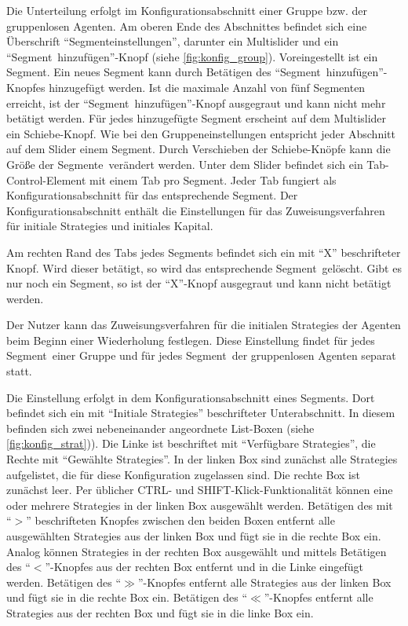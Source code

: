 \documentclass[parskip=full,11pt]{scrartcl}
\def\segment{Segment}
\def\segments{Segmente}
\begin{document}
Die Unterteilung erfolgt im Konfigurationsabschnitt einer Gruppe bzw. der gruppenlosen Agenten. Am oberen Ende des Abschnittes befindet sich eine Überschrift \enquote{\segment einstellungen}, darunter ein \Gls{Multislider} und ein \enquote{\segment\ hinzufügen}-Knopf (siehe \cref{fig:konfig_group}). Voreingestellt ist ein Segment. Ein neues Segment kann durch Betätigen des \enquote{\segment\ hinzufügen}-Knopfes hinzugefügt werden. Ist die maximale Anzahl von fünf \segments n erreicht, ist der \enquote{\segment\ hinzufügen}-Knopf ausgegraut und kann nicht mehr betätigt werden. Für jedes hinzugefügte Segment erscheint auf dem \Gls{Multislider} ein Schiebe-Knopf. Wie bei den Gruppeneinstellungen entspricht jeder Abschnitt auf dem Slider einem \segment. Durch Verschieben der Schiebe-Knöpfe kann die Größe der \segments\ verändert werden. Unter dem Slider befindet sich ein Tab-Control-Element mit einem Tab pro \segment. Jeder Tab fungiert als Konfigurationsabschnitt für das entsprechende \segment. Der Konfigurationsabschnitt enthält die Einstellungen für das Zuweisungsverfahren für initiale \Glspl{Strategie} und initiales \Gls{Kapital}.

Am rechten Rand des Tabs jedes \segment s befindet sich ein mit \enquote{X} beschrifteter Knopf. Wird dieser betätigt, so wird das entsprechende \segment\ gelöscht. Gibt es nur noch ein \segment, so ist der \enquote{X}-Knopf ausgegraut und kann nicht betätigt werden.

Der \Gls{Nutzer} kann das Zuweisungsverfahren für die initialen \Glspl{Strategie} der Agenten beim Beginn einer Wiederholung festlegen. Diese Einstellung findet für jedes \segment\ einer Gruppe und für jedes \segment\ der gruppenlosen Agenten separat statt.

Die Einstellung erfolgt in dem Konfigurationsabschnitt eines \segment s. Dort befindet sich ein mit \enquote{Initiale \Glspl{Strategie}} beschrifteter Unterabschnitt. In diesem befinden sich zwei nebeneinander angeordnete List-Boxen (siehe \cref{fig:konfig_strat})). Die Linke ist beschriftet mit \enquote{Verfügbare \Glspl{Strategie}}, die Rechte mit \enquote{Gewählte \Glspl{Strategie}}. In der linken Box sind zunächst alle \Glspl{Strategie} aufgelistet, die für diese \Gls{Konfiguration} zugelassen sind. Die rechte Box ist zunächst leer. Per üblicher \textsf{CTRL}- und \textsf{SHIFT}-Klick-Funktionalität können eine oder mehrere \Glspl{Strategie} in der linken Box ausgewählt werden. Betätigen des mit \enquote{\(>\)} beschrifteten Knopfes zwischen den beiden Boxen entfernt alle ausgewählten \Glspl{Strategie} aus der linken Box und fügt sie in die rechte Box ein. Analog können \Glspl{Strategie} in der rechten Box ausgewählt und mittels Betätigen des \enquote{\(<\)}-Knopfes aus der rechten Box entfernt und in die Linke eingefügt werden. Betätigen des \enquote{\(\gg\)}-Knopfes entfernt alle \Glspl{Strategie} aus der linken Box und fügt sie in die rechte Box ein. Betätigen des \enquote{\(\ll\)}-Knopfes entfernt alle \Glspl{Strategie} aus der rechten Box und fügt sie in die linke Box ein.
\end{document}
